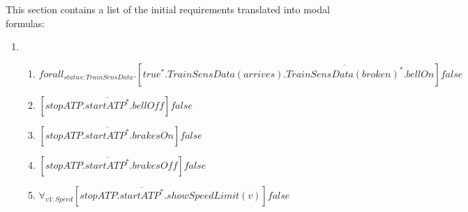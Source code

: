 \documentclass[11pt,a4paper]{article}
\begin{document}
This section contains a list of the initial requirements translated into modal formulas:
\begin{enumerate}
\item
\begin{enumerate}
\item $forall _{status:TrainSensData}.[true^* . TrainSensData(arrives).\overline{TrainSensData(broken)^*}.bellOn]false$\\
\item $[stopATP.\overline{startATP^*}.bellOff]false$\\
\item $[stopATP.\overline{startATP^*}.brakesOn]false$\\
\item $[stopATP.\overline{startATP^*}.brakesOff]false$\\
\item $\forall _{ v1:Speed} [stopATP.\overline{startATP^*}.showSpeedLimit(v)]false$\\
\end{enumerate}


\end{enumerate}
\end{document}
